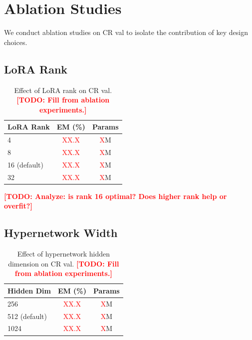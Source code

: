 \documentclass[11pt]{article}
\newcommand{\todo}[1]{\textcolor{red}{\textbf{[TODO: #1]}}}
\newcommand{\todoinline}[1]{\textcolor{red}{#1}}
\begin{document}
\section{Ablation Studies}
\label{sec:ablations}

We conduct ablation studies on CR val to isolate the contribution of key design choices.

\subsection{LoRA Rank}

\begin{table}[t]
\centering
\small
\begin{tabular}{lcc}
\toprule
LoRA Rank & EM (\%) & Params \\
\midrule
4 & \todoinline{XX.X} & \todoinline{X}M \\
8 & \todoinline{XX.X} & \todoinline{X}M \\
16 (default) & \todoinline{XX.X} & \todoinline{X}M \\
32 & \todoinline{XX.X} & \todoinline{X}M \\
\bottomrule
\end{tabular}
\caption{Effect of LoRA rank on CR val. \todo{Fill from ablation experiments.}}
\label{tab:ablation_rank}
\end{table}

\todo{Analyze: is rank 16 optimal? Does higher rank help or overfit?}

\subsection{Hypernetwork Width}

\begin{table}[t]
\centering
\small
\begin{tabular}{lcc}
\toprule
Hidden Dim & EM (\%) & Params \\
\midrule
256 & \todoinline{XX.X} & \todoinline{X}M \\
512 (default) & \todoinline{XX.X} & \todoinline{X}M \\
1024 & \todoinline{XX.X} & \todoinline{X}M \\
\bottomrule
\end{tabular}
\caption{Effect of hypernetwork hidden dimension on CR val. \todo{Fill from ablation experiments.}}
\label{tab:ablation_width}
\end{table}
\end{document}
